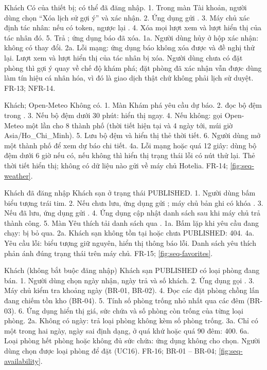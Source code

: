 {Khách}
{Có  của thiết bị; có thể đã đăng nhập.}
{1. Trong màn Tài khoản, người dùng chọn ``Xóa lịch sử gợi ý'' và xác nhận. 2. Ứng dụng gửi . 3. Máy chủ xác định tác nhân:  nếu có token, ngược lại . 4. Xóa mọi lượt xem và lượt hiển thị của tác nhân đó. 5. Trả ; ứng dụng báo đã xóa.}
{1a. Người dùng hủy ở hộp xác nhận: không có thay đổi. 2a. Lỗi mạng: ứng dụng báo không xóa được và đề nghị thử lại.}
{Lượt xem và lượt hiển thị của tác nhân bị xóa. Người dùng chưa có đặt phòng thì gợi ý quay về chế độ khám phá; đặt phòng đã xác nhận vẫn được dùng làm tín hiệu cá nhân hóa, vì đó là giao dịch thật chứ không phải lịch sử duyệt.}
{FR-13; NFR-14.}

{Khách; Open-Meteo}
{Không có.}
{1. Màn Khám phá yêu cầu dự báo. 2.  đọc bộ đệm trong . 3. Nếu bộ đệm dưới 30 phút: hiển thị ngay. 4. Nếu không: gọi Open-Meteo một lần cho 8 thành phố (thời tiết hiện tại và 4 ngày tới, múi giờ Asia/Ho\_Chi\_Minh). 5. Lưu bộ đệm và hiển thị thẻ thời tiết. 6. Người dùng mở một thành phố để xem dự báo chi tiết.}
{4a. Lỗi mạng hoặc quá 12 giây: dùng bộ đệm dưới 6 giờ nếu có, nếu không thì hiển thị trạng thái lỗi có nút thử lại.}
{Thẻ thời tiết hiển thị; không có dữ liệu nào gửi về máy chủ Hotelia.}
{FR-14; \cref{fig:seq-weather}.}

{Khách đã đăng nhập}
{Khách sạn ở trạng thái PUBLISHED.}
{1. Người dùng bấm biểu tượng trái tim. 2. Nếu chưa lưu, ứng dụng gửi ; máy chủ  bản ghi có khóa . 3. Nếu đã lưu, ứng dụng gửi . 4. Ứng dụng cập nhật danh sách sau khi máy chủ trả thành công. 5. Màn Yêu thích tải danh sách qua .}
{1a. Bấm lặp khi yêu cầu đang chạy: bị bỏ qua. 2a. Khách sạn không tồn tại hoặc chưa PUBLISHED: 404. 4a. Yêu cầu lỗi: biểu tượng giữ nguyên, hiển thị thông báo lỗi.}
{Danh sách yêu thích phản ánh đúng trạng thái trên máy chủ.}
{FR-15; \cref{fig:seq-favorites}.}

{Khách (không bắt buộc đăng nhập)}
{Khách sạn PUBLISHED có loại phòng đang bán.}
{1. Người dùng chọn ngày nhận, ngày trả và số khách. 2. Ứng dụng gọi . 3. Máy chủ kiểm tra khoảng ngày (BR-01, BR-02). 4. Đọc các đặt phòng chồng lấn đang chiếm tồn kho (BR-04). 5. Tính số phòng trống nhỏ nhất qua các đêm (BR-03). 6. Ứng dụng hiển thị giá, sức chứa và số phòng còn trống của từng loại phòng.}
{2a. Không có ngày: trả loại phòng không kèm số phòng trống. 3a. Chỉ có một trong hai ngày, ngày sai định dạng, ở quá khứ hoặc quá 90 đêm: 400. 6a. Loại phòng hết phòng hoặc không đủ sức chứa: ứng dụng không cho chọn.}
{Người dùng chọn được loại phòng để đặt (UC16).}
{FR-16; BR-01 -- BR-04; \cref{fig:seq-availability}.}

